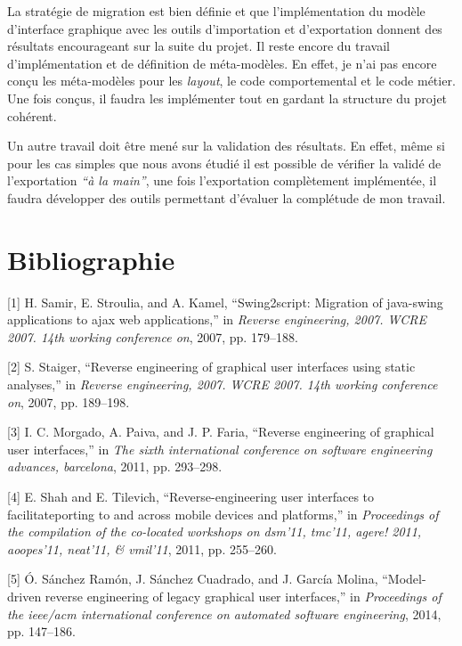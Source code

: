 \documentclass[11pt,]{article}
\begin{document}
La stratégie de migration est bien définie et que l'implémentation du
modèle d'interface graphique avec les outils d'importation et
d'exportation donnent des résultats encourageant sur la suite du projet.
Il reste encore du travail d'implémentation et de définition de
méta-modèles. En effet, je n'ai pas encore conçu les méta-modèles pour
les \emph{layout}, le code comportemental et le code métier. Une fois
conçus, il faudra les implémenter tout en gardant la structure du projet
cohérent.

Un autre travail doit être mené sur la validation des résultats. En
effet, même si pour les cas simples que nous avons étudié il est
possible de vérifier la validé de l'exportation \emph{``à la main''},
une fois l'exportation complètement implémentée, il faudra développer
des outils permettant d'évaluer la complétude de mon travail. \newpage

\hypertarget{bibliographie}{%
\section*{Bibliographie}\label{bibliographie}}

\hypertarget{refs}{}
\leavevmode\hypertarget{ref-samir2007swing2script}{}%
{[}1{]} H. Samir, E. Stroulia, and A. Kamel, ``Swing2script: Migration
of java-swing applications to ajax web applications,'' in \emph{Reverse
engineering, 2007. WCRE 2007. 14th working conference on}, 2007, pp.
179--188.

\leavevmode\hypertarget{ref-staiger2007reverse}{}%
{[}2{]} S. Staiger, ``Reverse engineering of graphical user interfaces
using static analyses,'' in \emph{Reverse engineering, 2007. WCRE 2007.
14th working conference on}, 2007, pp. 189--198.

\leavevmode\hypertarget{ref-morgado2011reverse}{}%
{[}3{]} I. C. Morgado, A. Paiva, and J. P. Faria, ``Reverse engineering
of graphical user interfaces,'' in \emph{The sixth international
conference on software engineering advances, barcelona}, 2011, pp.
293--298.

\leavevmode\hypertarget{ref-shah2011reverse}{}%
{[}4{]} E. Shah and E. Tilevich, ``Reverse-engineering user interfaces
to facilitateporting to and across mobile devices and platforms,'' in
\emph{Proceedings of the compilation of the co-located workshops on
dsm'11, tmc'11, agere! 2011, aoopes'11, neat'11, \& vmil'11}, 2011, pp.
255--260.

\leavevmode\hypertarget{ref-sanchez2014model}{}%
{[}5{]} Ó. Sánchez Ramón, J. Sánchez Cuadrado, and J. García Molina,
``Model-driven reverse engineering of legacy graphical user
interfaces,'' in \emph{Proceedings of the ieee/acm international
conference on automated software engineering}, 2014, pp. 147--186.
\end{document}
